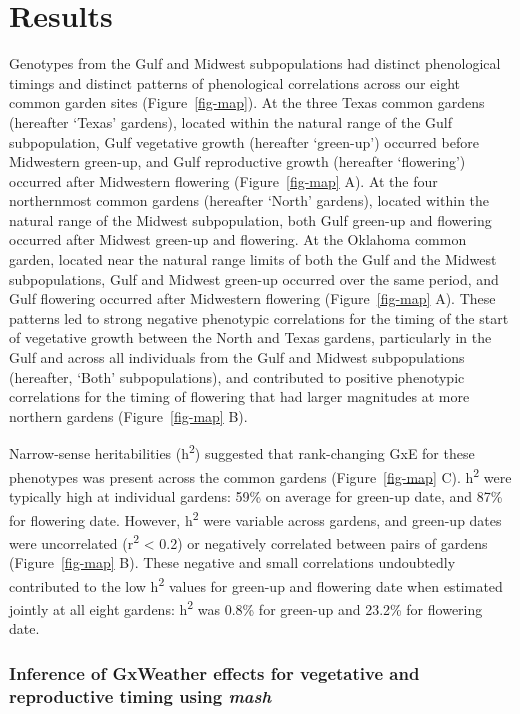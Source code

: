 \documentclass[
  9pt,
  twocolumn,
  twoside]{pnas-new}
\begin{document}
\section{Results}\label{results}

Genotypes from the Gulf and Midwest subpopulations had distinct
phenological timings and distinct patterns of phenological correlations
across our eight common garden sites (Figure~\ref{fig-map}). At the
three Texas common gardens (hereafter `Texas' gardens), located within
the natural range of the Gulf subpopulation, Gulf vegetative growth
(hereafter `green-up') occurred before Midwestern green-up, and Gulf
reproductive growth (hereafter `flowering') occurred after Midwestern
flowering (Figure~\ref{fig-map} A). At the four northernmost common
gardens (hereafter `North' gardens), located within the natural range of
the Midwest subpopulation, both Gulf green-up and flowering occurred
after Midwest green-up and flowering. At the Oklahoma common garden,
located near the natural range limits of both the Gulf and the Midwest
subpopulations, Gulf and Midwest green-up occurred over the same period,
and Gulf flowering occurred after Midwestern flowering
(Figure~\ref{fig-map} A). These patterns led to strong negative
phenotypic correlations for the timing of the start of vegetative growth
between the North and Texas gardens, particularly in the Gulf and across
all individuals from the Gulf and Midwest subpopulations (hereafter,
`Both' subpopulations), and contributed to positive phenotypic
correlations for the timing of flowering that had larger magnitudes at
more northern gardens (Figure~\ref{fig-map} B).

Narrow-sense heritabilities (h\textsuperscript{2}) suggested that
rank-changing GxE for these phenotypes was present across the common
gardens (Figure~\ref{fig-map} C). h\textsuperscript{2} were typically
high at individual gardens: 59\% on average for green-up date, and 87\%
for flowering date. However, h\textsuperscript{2} were variable across
gardens, and green-up dates were uncorrelated (r\textsuperscript{2}
\textless{} 0.2) or negatively correlated between pairs of gardens
(Figure~\ref{fig-map} B). These negative and small correlations
undoubtedly contributed to the low h\textsuperscript{2} values for
green-up and flowering date when estimated jointly at all eight gardens:
h\textsuperscript{2} was 0.8\% for green-up and 23.2\% for flowering
date.

\subsubsection{\texorpdfstring{Inference of GxWeather effects for
vegetative and reproductive timing using
\emph{mash}}{Inference of GxWeather effects for vegetative and reproductive timing using mash}}\label{inference-of-gxweather-effects-for-vegetative-and-reproductive-timing-using-mash}
\end{document}
